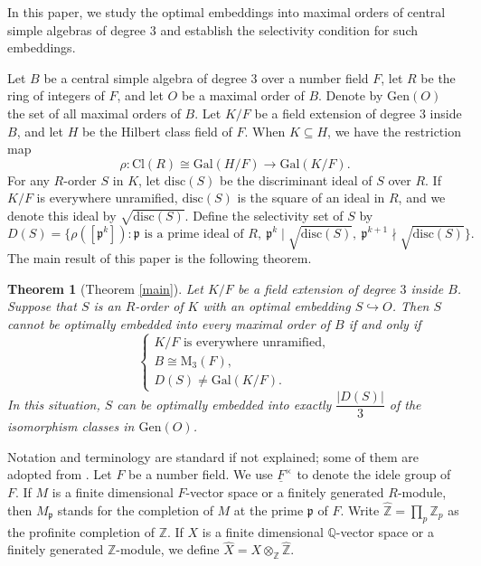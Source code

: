 \documentclass[12pt]{article}
\theoremstyle{plain}
\newtheorem{theorem}{Theorem}[section]
\theoremstyle{definition}
\theoremstyle{remark}
\begin{document}
In this paper, we study the optimal embeddings into maximal orders of central simple algebras of degree $3$ and establish the selectivity condition for such embeddings.  

Let $B$ be a central simple algebra of degree $3$ over a number field $F$, let $R$ be the ring of integers of $F$, and let $O$ be a maximal order of $B$. Denote by $\mathrm{Gen}(O)$ the set of all maximal orders of $B$. Let $K/F$ be a field extension of degree $3$ inside $B$, and let $H$ be the Hilbert class field of $F$. When $K\subseteq H$, we have the restriction map
$$\rho: \mathrm{Cl}(R)\cong \mathrm{Gal}(H/F)\longrightarrow \mathrm{Gal}(K/F).$$
For any $R$-order $S$ in $K$, let $\mathrm{disc}(S)$ be the discriminant ideal of $S$ over $R$. If $K/F$ is everywhere unramified, $\mathrm{disc}(S)$ is the square of an ideal in $R$, and we denote this ideal by $\sqrt{\mathrm{disc}(S)}$. Define the selectivity set of $S$ by
$$D(S) = \{ \rho([\mathfrak{p}^k]) : \mathfrak{p} \text{ is a prime ideal of } R,\ \mathfrak{p}^k \mid \sqrt{\mathrm{disc}(S)},\ \mathfrak{p}^{k+1} \nmid \sqrt{\mathrm{disc}(S)} \}.$$
The main result of this paper is the following theorem.

\begin{theorem}[Theorem \ref{main}]
Let $K/F$ be a field extension of degree $3$ inside $B$. Suppose that $S$ is an $R$-order of $K$ with an optimal embedding $S\hookrightarrow O$. Then $S$ cannot be optimally embedded into every maximal order of $B$ if and only if 
$$\begin{cases} 
K/F \text{ is everywhere unramified}, \\
B\cong \mathrm{M}_3(F), \\
D(S)\neq \mathrm{Gal}(K/F).
\end{cases}$$
In this situation, $S$ can be optimally embedded into exactly $\dfrac{|D(S)|}{3}$ of the isomorphism classes in $\mathrm{Gen}(O)$.
\end{theorem}

Notation and terminology are standard if not explained; some of them are adopted from \cite{voight2021quaternion}. Let $F$ be a number field. We use $\underline{F}^\times$ to denote the idele group of $F$. If $M$ is a finite dimensional $F$-vector space or a finitely generated $R$-module, then $M_\mathfrak{p}$ stands for the completion of $M$ at the prime $\mathfrak{p}$ of $F$. Write $\widehat{\mathbb{Z}}=\prod_p \mathbb{Z}_p$ as the profinite completion of $\mathbb{Z}$. If $X$ is a finite dimensional $\mathbb{Q}$-vector space or a finitely generated $\mathbb{Z}$-module, we define $\widehat{X}=X\otimes_\mathbb{Z}\widehat{\mathbb{Z}}$.
\end{document}
